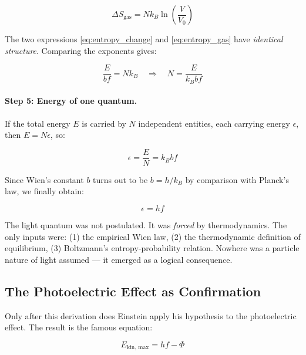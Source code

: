 \begin{equation}
    \Delta S_{\text{gas}} = N k_B \ln\!\left(\frac{V}{V_0}\right)
    \label{eq:entropy_gas}
\end{equation}

The two expressions \eqref{eq:entropy_change} and \eqref{eq:entropy_gas} have 
\emph{identical structure}. Comparing the exponents gives:

\begin{equation}
    \frac{E}{bf} = N k_B \quad \Longrightarrow \quad N = \frac{E}{k_B b f}
    \label{eq:quanta_count}
\end{equation}

\paragraph{Step 5: Energy of one quantum.}
If the total energy $E$ is carried by $N$ independent entities, each carrying energy 
$\epsilon$, then $E = N\epsilon$, so:

\begin{equation}
    \epsilon = \frac{E}{N} = k_B b f
    \label{eq:quantum_energy_wien}
\end{equation}

Since Wien's constant $b$ turns out to be $b = h/k_B$ by comparison with Planck's 
law, we finally obtain:

\begin{equation}
    \boxed{\epsilon = hf}
    \label{eq:quantum_energy_final}
\end{equation}

\begin{revolutionary}
    The light quantum was not postulated. It was \emph{forced} by thermodynamics. 
    The only inputs were: (1) the empirical Wien law, (2) the thermodynamic 
    definition of equilibrium, (3) Boltzmann's entropy-probability relation. 
    Nowhere was a particle nature of light assumed — it emerged as a logical 
    consequence.
\end{revolutionary}

\subsection{The Photoelectric Effect as Confirmation}

Only after this derivation does Einstein apply his hypothesis to the photoelectric 
effect. The result is the famous equation:

\begin{equation}
    E_{\text{kin, max}} = hf - \Phi
    \label{eq:photoelectric}
\end{equation}

